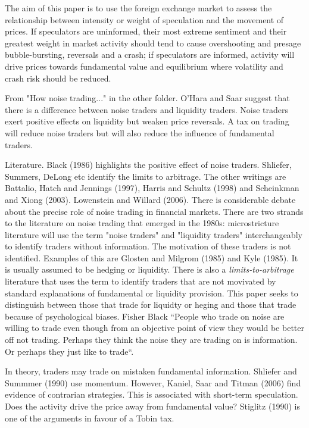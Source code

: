 \documentclass[12pt, a4paper, oneside]{article} %
\begin{document}
The aim of this paper is to use the foreign exchange market to assess the relationship between intensity or weight of speculation and the movement of prices.  If speculators are uninformed, their most extreme sentiment and their greatest weight in market activity should tend to cause overshooting and presage bubble-bursting, reversals and a crash; if speculators are informed, activity will drive prices towards fundamental value and equilibrium where volatility and crash risk should be reduced.    

From "How noise trading..." in the other folder. 
O'Hara and Saar suggest that there is a difference between noise traders and liquidity traders.  Noise traders exert positive effects on liquidity but weaken price reversals. A tax on trading will reduce noise traders but will also reduce the influence of fundamental traders. 

Literature.  Black (1986) highlights the positive effect of noise traders. Shliefer, Summers, DeLong etc identify the limits to arbitrage. The other writings are Battalio, Hatch and Jennings (1997), Harris and Schultz (1998) and Scheinkman and Xiong (2003).  Lowenstein and Willard (2006).  There is considerable debate about the precise role of noise trading in financial markets. There are two strands to the literature on noise trading that emerged in the 1980s:  microstricture literature will use the term "noise traders" and "liquidity traders" interchangeably to identify traders without information.  The motivation of these traders is not identified. Examples of this are Glosten and Milgrom (1985) and Kyle (1985). It is usually assumed to be hedging or liquidity. There is also a \emph{limits-to-arbitrage} literature that uses the term to identify traders that are not movivated by standard explanations of fundamental or liquidity provision. This paper seeks to distinguish between those that trade for liquidty or heging and those that trade because of psychological biases. Fisher Black ``People who trade on noise 
are willing to trade even though from an objective point of view they would be better off 
not trading. Perhaps they think the noise they are trading on is information. Or perhaps 
they just like to trade``.  

In theory, traders may trade on mistaken fundamental information.  Shliefer and Summmer (1990) use momentum.  However, Kaniel, Saar and Titman (2006) find evidence of contrarian strategies. This is associated with short-term speculation. Does the activity drive the price away from fundamental value? Stiglitz (1990) is one of the arguments in favour of a Tobin tax. 
\end{document}
